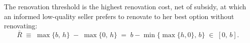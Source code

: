 \label{def:threshold}
The renovation threshold is the highest renovation cost, net of subsidy, at which an informed low-quality seller prefers to renovate to her best option without renovating:
\begin{equation}
    \bar{R}\;\equiv\;\max\{b,\,h\}\;-\;\max\{0,\,h\}\;=\;b-\min\big\{\max\{h,0\},\,b\big\}\;\in\;[0,\,b].
    \label{eq:threshold}
\end{equation}
